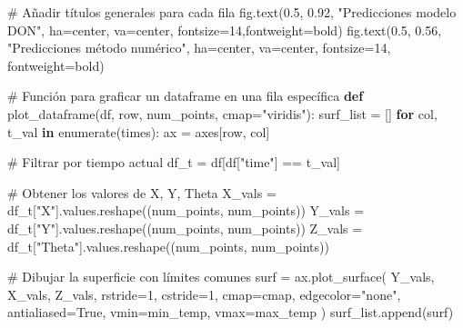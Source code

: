 \documentclass[
  spanish,
  us-letterpaper,
  DIV=11,
  numbers=noendperiod]{scrreprt}
\newenvironment{Shaded}{\begin{snugshade}}{\end{snugshade}}
\newcommand{\BuiltInTok}[1]{\textcolor[rgb]{0.00,0.23,0.31}{#1}}
\newcommand{\CommentTok}[1]{\textcolor[rgb]{0.37,0.37,0.37}{#1}}
\newcommand{\ControlFlowTok}[1]{\textcolor[rgb]{0.00,0.23,0.31}{\textbf{#1}}}
\newcommand{\DecValTok}[1]{\textcolor[rgb]{0.68,0.00,0.00}{#1}}
\newcommand{\FloatTok}[1]{\textcolor[rgb]{0.68,0.00,0.00}{#1}}
\newcommand{\KeywordTok}[1]{\textcolor[rgb]{0.00,0.23,0.31}{\textbf{#1}}}
\newcommand{\NormalTok}[1]{\textcolor[rgb]{0.00,0.23,0.31}{#1}}
\newcommand{\OperatorTok}[1]{\textcolor[rgb]{0.37,0.37,0.37}{#1}}
\newcommand{\StringTok}[1]{\textcolor[rgb]{0.13,0.47,0.30}{#1}}
\newcommand{\VariableTok}[1]{\textcolor[rgb]{0.07,0.07,0.07}{#1}}
\theoremstyle{plain}
\theoremstyle{definition}
\theoremstyle{remark}
\begin{document}
\begin{Shaded}
\begin{Highlighting}[]
\CommentTok{\# Añadir títulos generales para cada fila}
\NormalTok{fig.text(}\FloatTok{0.5}\NormalTok{, }\FloatTok{0.92}\NormalTok{, }\StringTok{"Predicciones modelo DON"}\NormalTok{, }
\NormalTok{        ha}\OperatorTok{=}\StringTok{\textquotesingle{}center\textquotesingle{}}\NormalTok{, va}\OperatorTok{=}\StringTok{\textquotesingle{}center\textquotesingle{}}\NormalTok{, fontsize}\OperatorTok{=}\DecValTok{14}\NormalTok{,fontweight}\OperatorTok{=}\StringTok{\textquotesingle{}bold\textquotesingle{}}\NormalTok{)}
\NormalTok{fig.text(}\FloatTok{0.5}\NormalTok{, }\FloatTok{0.56}\NormalTok{, }\StringTok{"Predicciones método numérico"}\NormalTok{,}
\NormalTok{        ha}\OperatorTok{=}\StringTok{\textquotesingle{}center\textquotesingle{}}\NormalTok{, va}\OperatorTok{=}\StringTok{\textquotesingle{}center\textquotesingle{}}\NormalTok{, fontsize}\OperatorTok{=}\DecValTok{14}\NormalTok{, fontweight}\OperatorTok{=}\StringTok{\textquotesingle{}bold\textquotesingle{}}\NormalTok{)}

\CommentTok{\# Función para graficar un dataframe en una fila específica}
\KeywordTok{def}\NormalTok{ plot\_dataframe(df, row, num\_points, cmap}\OperatorTok{=}\StringTok{"viridis"}\NormalTok{):}
\NormalTok{    surf\_list }\OperatorTok{=}\NormalTok{ []}
    \ControlFlowTok{for}\NormalTok{ col, t\_val }\KeywordTok{in} \BuiltInTok{enumerate}\NormalTok{(times):}
\NormalTok{        ax }\OperatorTok{=}\NormalTok{ axes[row, col]}
        
        \CommentTok{\# Filtrar por tiempo actual}
\NormalTok{        df\_t }\OperatorTok{=}\NormalTok{ df[df[}\StringTok{"time"}\NormalTok{] }\OperatorTok{==}\NormalTok{ t\_val]}

        \CommentTok{\# Obtener los valores de X, Y, Theta}
\NormalTok{        X\_vals }\OperatorTok{=}\NormalTok{ df\_t[}\StringTok{"X"}\NormalTok{].values.reshape((num\_points, num\_points))}
\NormalTok{        Y\_vals }\OperatorTok{=}\NormalTok{ df\_t[}\StringTok{"Y"}\NormalTok{].values.reshape((num\_points, num\_points))}
\NormalTok{        Z\_vals }\OperatorTok{=}\NormalTok{ df\_t[}\StringTok{"Theta"}\NormalTok{].values.reshape((num\_points, num\_points))}

        \CommentTok{\# Dibujar la superficie con límites comunes}
\NormalTok{        surf }\OperatorTok{=}\NormalTok{ ax.plot\_surface(}
\NormalTok{            Y\_vals, X\_vals, Z\_vals,}
\NormalTok{            rstride}\OperatorTok{=}\DecValTok{1}\NormalTok{, cstride}\OperatorTok{=}\DecValTok{1}\NormalTok{,}
\NormalTok{            cmap}\OperatorTok{=}\NormalTok{cmap,}
\NormalTok{            edgecolor}\OperatorTok{=}\StringTok{"none"}\NormalTok{,}
\NormalTok{            antialiased}\OperatorTok{=}\VariableTok{True}\NormalTok{,}
\NormalTok{            vmin}\OperatorTok{=}\NormalTok{min\_temp,}
\NormalTok{            vmax}\OperatorTok{=}\NormalTok{max\_temp}
\NormalTok{        )}
\NormalTok{        surf\_list.append(surf)}


\end{Highlighting}
\end{Shaded}
\end{document}
